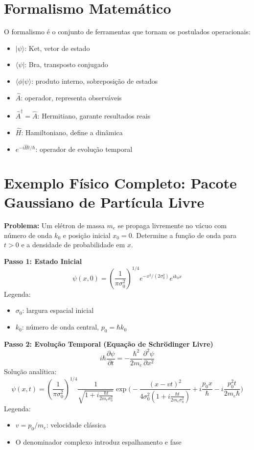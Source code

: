 \documentclass[a4paper,12pt]{article}
\begin{document}
\section*{Formalismo Matemático}
O formalismo é o conjunto de ferramentas que tornam os postulados operacionais:
\begin{itemize}
    \item $|\psi\rangle$: Ket, vetor de estado
    \item $\langle \psi|$: Bra, transposto conjugado
    \item $\langle \phi|\psi\rangle$: produto interno, sobreposição de estados
    \item $\hat{A}$: operador, representa observáveis
    \item $\hat{A}^\dagger = \hat{A}$: Hermitiano, garante resultados reais
    \item $\hat{H}$: Hamiltoniano, define a dinâmica
    \item $e^{-i\hat{H}t/\hbar}$: operador de evolução temporal
\end{itemize}

\section*{Exemplo Físico Completo: Pacote Gaussiano de Partícula Livre}
\textbf{Problema:} Um elétron de massa $m_e$ se propaga livremente no vácuo com número de onda $k_0$ e posição inicial $x_0 = 0$. Determine a função de onda para $t>0$ e a densidade de probabilidade em $x$.

\textbf{Passo 1: Estado Inicial}
\[
\psi(x,0) = \left(\frac{1}{\pi \sigma_0^2}\right)^{1/4} e^{-x^2/(2\sigma_0^2)} e^{i k_0 x}
\]
Legenda:
\begin{itemize}
    \item $\sigma_0$: largura espacial inicial
    \item $k_0$: número de onda central, $p_0 = \hbar k_0$
\end{itemize}

\textbf{Passo 2: Evolução Temporal (Equação de Schrödinger Livre)}
\[
i\hbar \frac{\partial \psi}{\partial t} = -\frac{\hbar^2}{2 m_e} \frac{\partial^2 \psi}{\partial x^2}
\]
Solução analítica:
\[
\psi(x,t) = \left(\frac{1}{\pi\sigma_0^2}\right)^{1/4} \frac{1}{\sqrt{1 + i\frac{\hbar t}{2 m_e \sigma_0^2}}} 
\exp\Bigg(- \frac{(x - v t)^2}{4\sigma_0^2 (1 + i\frac{\hbar t}{2 m_e \sigma_0^2})} + i \frac{p_0 x}{\hbar} - i \frac{p_0^2 t}{2 m_e \hbar}\Bigg)
\]
Legenda:
\begin{itemize}
    \item $v = p_0/m_e$: velocidade clássica
    \item O denominador complexo introduz espalhamento e fase
\end{itemize}
\end{document}
